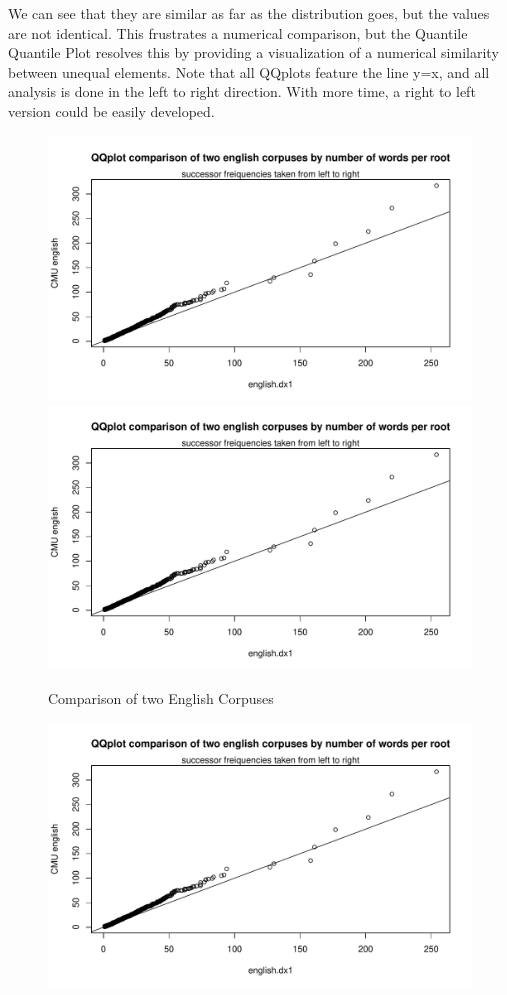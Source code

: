 \documentclass{article}
\begin{document}
We can see that they are similar as far as the distribution goes, but the values are not identical. This frustrates a numerical comparison, but the Quantile Quantile Plot resolves this by providing a visualization of a numerical similarity between unequal elements. Note that all QQplots feature the line y=x, and all analysis is done in the left to right direction. With more time, a right to left version could be easily developed.
		
		\begin{figure}[H]
		\centering
		\caption{Comparison of two English Corpuses}
		\includegraphics[scale=.7,page=1]{plots.pdf}
		\includegraphics[scale=.7,page=2]{plots.pdf}
		\end{figure}
		\begin{figure}[H]
		\includegraphics[scale=.7,page=3]{plots.pdf}
		\end{figure}
\end{document}
